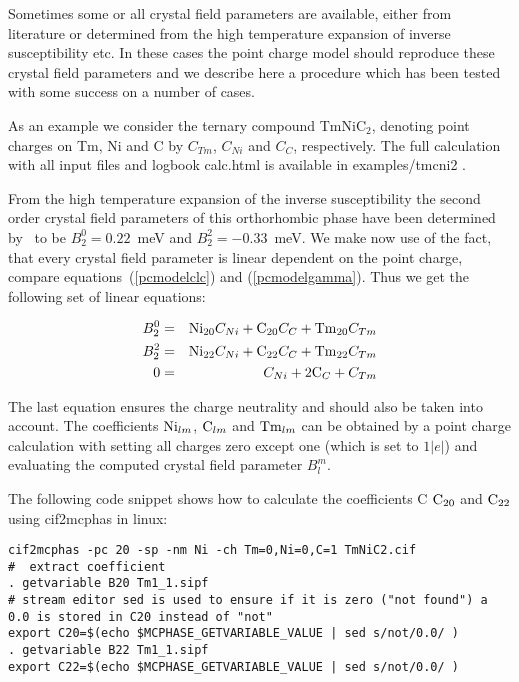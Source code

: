 Sometimes some or all crystal field parameters are available, either from literature or determined from
the high temperature expansion of inverse susceptibility etc.  In these cases the point charge model
should reproduce these crystal field parameters and we describe here a procedure which has been tested
with some success on a number of cases.

As an example we consider the ternary compound TmNiC$_2$, denoting point charges on
Tm, Ni and C by $C_{Tm}$, $C_{Ni}$ and $C_{C}$, respectively.
The full calculation with all input files and logbook {\prg calc.html} is available in {\prg examples/tmcni2 }.

From the high temperature expansion of the inverse susceptibility the second order crystal field
parameters of this orthorhombic phase have been determined by~\cite{roman23-125137}
to be $B_2^0=0.22$~meV and $B_2^2=-0.33$~meV. 
We make now use of the fact, that every crystal field parameter is linear dependent on
the point charge, compare equations~(\ref{pcmodelclc}) and (\ref{pcmodelgamma}).
Thus we get the following set of linear equations:

\begin{eqnarray}\label{pclinredproblem}
B_2^0 &=& {\rm Ni}_{20} C_{Ni}+{\rm C}_{20} C_{C}+{\rm Tm}_{20} C_{Tm} \nonumber \\
B_2^2 &=& {\rm Ni}_{22} C_{Ni}+{\rm C}_{22} C_{C}+{\rm Tm}_{22} C_{Tm} \nonumber \\
0 &=& C_{Ni}+2 {\rm C}_{C}+ C_{Tm} 
\end{eqnarray}

The last equation ensures the charge neutrality and should also be taken into account.
The coefficients ${\rm Ni}_{lm}$, ${\rm C}_{lm}$ and ${\rm Tm}_{lm}$ can be obtained by
a point charge calculation with setting all charges zero except one (which is set to $1|e|$) and
evaluating the computed crystal field parameter $B_l^m$. 

The following code snippet shows how to calculate the coefficients
C ${\rm C}_{20}$ and ${\rm C}_{22}$ using {\prg cif2mcphas} in linux:

\begin{verbatim}
cif2mcphas -pc 20 -sp -nm Ni -ch Tm=0,Ni=0,C=1 TmNiC2.cif
#  extract coefficient 
. getvariable B20 Tm1_1.sipf
# stream editor sed is used to ensure if it is zero ("not found") a 0.0 is stored in C20 instead of "not"
export C20=$(echo $MCPHASE_GETVARIABLE_VALUE | sed s/not/0.0/ )
. getvariable B22 Tm1_1.sipf
export C22=$(echo $MCPHASE_GETVARIABLE_VALUE | sed s/not/0.0/ )
\end{verbatim}

